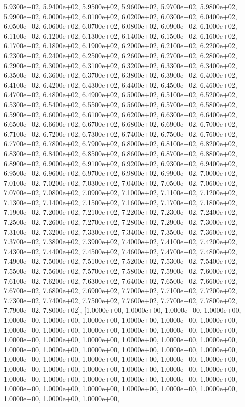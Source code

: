 \documentclass[letterpaper,10pt,english]{sphinxmanual}
\begin{document}
\begin{fulllineitems}
5.9300e+02, 5.9400e+02,         5.9500e+02, 5.9600e+02, 5.9700e+02, 5.9800e+02, 5.9900e+02,         6.0000e+02, 6.0100e+02, 6.0200e+02, 6.0300e+02, 6.0400e+02,         6.0500e+02, 6.0600e+02, 6.0700e+02, 6.0800e+02, 6.0900e+02,         6.1000e+02, 6.1100e+02, 6.1200e+02, 6.1300e+02, 6.1400e+02,         6.1500e+02, 6.1600e+02, 6.1700e+02, 6.1800e+02, 6.1900e+02,         6.2000e+02, 6.2100e+02, 6.2200e+02, 6.2300e+02, 6.2400e+02,         6.2500e+02, 6.2600e+02, 6.2700e+02, 6.2800e+02, 6.2900e+02,         6.3000e+02, 6.3100e+02, 6.3200e+02, 6.3300e+02, 6.3400e+02,         6.3500e+02, 6.3600e+02, 6.3700e+02, 6.3800e+02, 6.3900e+02,         6.4000e+02, 6.4100e+02, 6.4200e+02, 6.4300e+02, 6.4400e+02,         6.4500e+02, 6.4600e+02, 6.4700e+02, 6.4800e+02, 6.4900e+02,         6.5000e+02, 6.5100e+02, 6.5200e+02, 6.5300e+02, 6.5400e+02,         6.5500e+02, 6.5600e+02, 6.5700e+02, 6.5800e+02, 6.5900e+02,         6.6000e+02, 6.6100e+02, 6.6200e+02, 6.6300e+02, 6.6400e+02,         6.6500e+02, 6.6600e+02, 6.6700e+02, 6.6800e+02, 6.6900e+02,         6.7000e+02, 6.7100e+02, 6.7200e+02, 6.7300e+02, 6.7400e+02,         6.7500e+02, 6.7600e+02, 6.7700e+02, 6.7800e+02, 6.7900e+02,         6.8000e+02, 6.8100e+02, 6.8200e+02, 6.8300e+02, 6.8400e+02,         6.8500e+02, 6.8600e+02, 6.8700e+02, 6.8800e+02, 6.8900e+02,         6.9000e+02, 6.9100e+02, 6.9200e+02, 6.9300e+02, 6.9400e+02,         6.9500e+02, 6.9600e+02, 6.9700e+02, 6.9800e+02, 6.9900e+02,         7.0000e+02, 7.0100e+02, 7.0200e+02, 7.0300e+02, 7.0400e+02,         7.0500e+02, 7.0600e+02, 7.0700e+02, 7.0800e+02, 7.0900e+02,         7.1000e+02, 7.1100e+02, 7.1200e+02, 7.1300e+02, 7.1400e+02,         7.1500e+02, 7.1600e+02, 7.1700e+02, 7.1800e+02, 7.1900e+02,         7.2000e+02, 7.2100e+02, 7.2200e+02, 7.2300e+02, 7.2400e+02,         7.2500e+02, 7.2600e+02, 7.2700e+02, 7.2800e+02, 7.2900e+02,         7.3000e+02, 7.3100e+02, 7.3200e+02, 7.3300e+02, 7.3400e+02,         7.3500e+02, 7.3600e+02, 7.3700e+02, 7.3800e+02, 7.3900e+02,         7.4000e+02, 7.4100e+02, 7.4200e+02, 7.4300e+02, 7.4400e+02,         7.4500e+02, 7.4600e+02, 7.4700e+02, 7.4800e+02, 7.4900e+02,         7.5000e+02, 7.5100e+02, 7.5200e+02, 7.5300e+02, 7.5400e+02,         7.5500e+02, 7.5600e+02, 7.5700e+02, 7.5800e+02, 7.5900e+02,         7.6000e+02, 7.6100e+02, 7.6200e+02, 7.6300e+02, 7.6400e+02,         7.6500e+02, 7.6600e+02, 7.6700e+02, 7.6800e+02, 7.6900e+02,         7.7000e+02, 7.7100e+02, 7.7200e+02, 7.7300e+02, 7.7400e+02,         7.7500e+02, 7.7600e+02, 7.7700e+02, 7.7800e+02, 7.7900e+02,         7.8000e+02{]},        {[}1.0000e+00, 1.0000e+00, 1.0000e+00, 1.0000e+00, 1.0000e+00,         1.0000e+00, 1.0000e+00, 1.0000e+00, 1.0000e+00, 1.0000e+00,         1.0000e+00, 1.0000e+00, 1.0000e+00, 1.0000e+00, 1.0000e+00,         1.0000e+00, 1.0000e+00, 1.0000e+00, 1.0000e+00, 1.0000e+00,         1.0000e+00, 1.0000e+00, 1.0000e+00, 1.0000e+00, 1.0000e+00,         1.0000e+00, 1.0000e+00, 1.0000e+00, 1.0000e+00, 1.0000e+00,         1.0000e+00, 1.0000e+00, 1.0000e+00, 1.0000e+00, 1.0000e+00,         1.0000e+00, 1.0000e+00, 1.0000e+00, 1.0000e+00, 1.0000e+00,         1.0000e+00, 1.0000e+00, 1.0000e+00, 1.0000e+00, 1.0000e+00,         1.0000e+00, 1.0000e+00, 1.0000e+00, 1.0000e+00, 1.0000e+00,         1.0000e+00, 1.0000e+00, 1.0000e+00, 1.0000e+00, 1.0000e+00,  
\end{fulllineitems}
\end{document}
